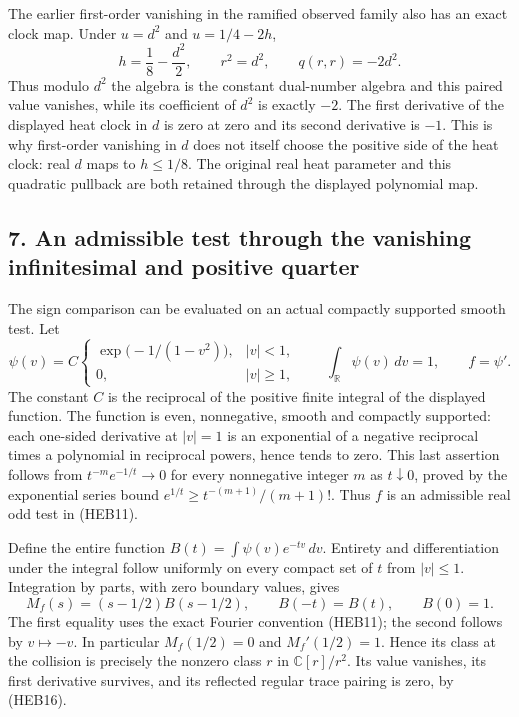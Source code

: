 \documentclass[
  10pt,
  a4paper,
]{article}
\begin{document}
The earlier first-order vanishing in the ramified observed family also
has an exact clock map. Under \(u=d^2\) and \(u=1/4-2h\), \[
h=\frac18-\frac{d^2}{2},\qquad r^2=d^2,\qquad q(r,r)=-2d^2.
\tag{HEB32a}
\] Thus modulo \(d^2\) the algebra is the constant dual-number algebra
and this paired value vanishes, while its coefficient of \(d^2\) is
exactly \(-2\). The first derivative of the displayed heat clock in
\(d\) is zero at zero and its second derivative is \(-1\). This is why
first-order vanishing in \(d\) does not itself choose the positive side
of the heat clock: real \(d\) maps to \(h\le1/8\). The original real
heat parameter and this quadratic pullback are both retained through the
displayed polynomial map.

\subsection{7. An admissible test through the vanishing infinitesimal
and positive
quarter}\label{an-admissible-test-through-the-vanishing-infinitesimal-and-positive-quarter}

The sign comparison can be evaluated on an actual compactly supported
smooth test. Let \[
\psi(v)=C\begin{cases}\exp\bigl(-1/(1-v^2)\bigr),&|v|<1,\\0,&|v|\ge1,\end{cases}
\qquad \int_{\mathbb R}\psi(v)\,dv=1,\qquad f=\psi'.
\tag{HEB33}
\] The constant \(C\) is the reciprocal of the positive finite integral
of the displayed function. The function is even, nonnegative, smooth and
compactly supported: each one-sided derivative at \(|v|=1\) is an
exponential of a negative reciprocal times a polynomial in reciprocal
powers, hence tends to zero. This last assertion follows from
\(t^{-m}e^{-1/t}\to0\) for every nonnegative integer \(m\) as
\(t\downarrow0\), proved by the exponential series bound
\(e^{1/t}\ge t^{-(m+1)}/(m+1)!\). Thus \(f\) is an admissible real odd
test in (HEB11).

Define the entire function \(B(t)=\int\psi(v)e^{-tv}\,dv\). Entirety and
differentiation under the integral follow uniformly on every compact set
of \(t\) from \(|v|\le1\). Integration by parts, with zero boundary
values, gives \[
M_f(s)=(s-1/2)B(s-1/2),\qquad B(-t)=B(t),\qquad B(0)=1.
\tag{HEB34}
\] The first equality uses the exact Fourier convention (HEB11); the
second follows by \(v\mapsto-v\). In particular \(M_f(1/2)=0\) and
\(M_f'(1/2)=1\). Hence its class at the collision is precisely the
nonzero class \(r\) in \(\mathbb C[r]/r^2\). Its value vanishes, its
first derivative survives, and its reflected regular trace pairing is
zero, by (HEB16).
\end{document}
